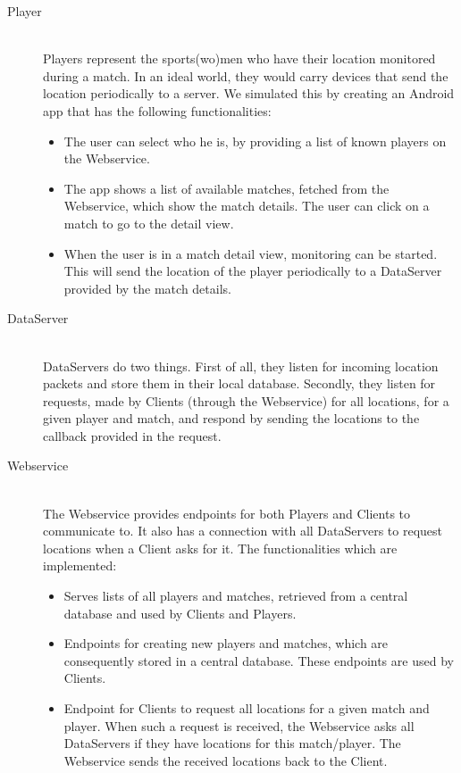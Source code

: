 \begin{description}
\item[Player] \hfill \\
Players represent the sports(wo)men who have their location monitored during a match. In an ideal world, they would carry devices that send the location periodically to a server. We simulated this by creating an Android app that has the following functionalities:
\begin{itemize}
    \item The user can select who he is, by providing a list of known players on the Webservice.
    \item The app shows a list of available matches, fetched from the Webservice, which show the match details. The user can click on a match to go to the detail view.
    \item When the user is in a match detail view, monitoring can be started. This will send the location of the player periodically to a DataServer provided by the match details.
\end{itemize}
\item[DataServer] \hfill \\
DataServers do two things. First of all, they listen for incoming location packets and store them in their local database. Secondly, they listen for requests, made by Clients (through the Webservice) for all locations, for a given player and match, and respond by sending the locations to the callback provided in the request.
\item[Webservice] \hfill \\
The Webservice provides endpoints for both Players and Clients to communicate to. It also has a connection with all DataServers to request locations when a Client asks for it. The functionalities which are implemented:
\begin{itemize}
    \item Serves lists of all players and matches, retrieved from a central database and used by Clients and Players.
    \item Endpoints for creating new players and matches, which are consequently stored in a central database. These endpoints are used by Clients.
    \item Endpoint for Clients to request all locations for a given match and player. When such a request is received, the Webservice asks all DataServers if they have locations for this match/player. The Webservice sends the received locations back to the Client.
\end{itemize}


\end{description}
